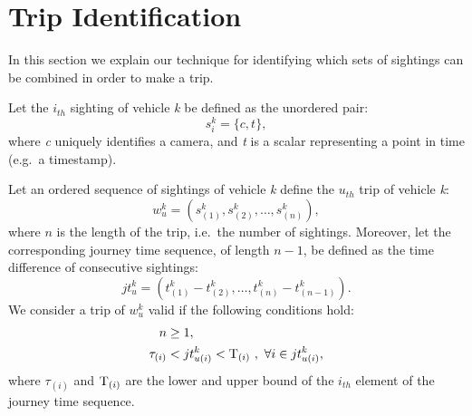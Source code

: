 \section{Trip Identification}\label{s.trips}

In this section we explain our technique for identifying which sets of sightings can be combined in order to make a trip.

Let the $i_{th}$ sighting of vehicle \emph{k} be defined as the unordered pair:
\begin{equation} \label{e.sighting}
s^{k}_{i} = \{ c, t \},
\end{equation}
where \emph{c} uniquely identifies a camera, and \emph{t} is a scalar representing a point in time (e.g.\ a timestamp).

Let an ordered sequence of sightings of vehicle \emph{k} define the $u_{th}$ trip of vehicle \emph{k}:
\begin{equation} \label{e.trip}
w^{k}_{u} = \left(s^{k}_{(1)}, s^{k}_{(2)}, \dots , s^{k}_{(n)}\right),
\end{equation}
where \( n \) is the length of the trip, i.e.\ the number of sightings. Moreover, let the corresponding journey time sequence, of length \(n-1\), be defined as the time difference of consecutive sightings:
\begin{equation} \label{e.journeytime}
jt^{k}_{u} = \left(t^{k}_{(1)} - t^{k}_{(2)}, \ldots, t^{k}_{(n)} - t^{k}_{(n-1)} \right).
\end{equation}
We consider a trip of \emph{$w^k_u$} valid if the following conditions hold:
\begin{align}
n &\ge 1 , \label{e.trip.constraints.1} \\
\tau_{(i)} &< jt^{k}_{u(i)} < \mathrm{T}_{(i)} \ , \ \forall i \in jt^{k}_{u(i)} \label{e.trip.constraints.2},
\end{align}
where $\tau_{(i)}$ and $\mathrm{T}_{(i)}$ are the lower and upper bound of the $i_{th}$ element of the journey time sequence.

